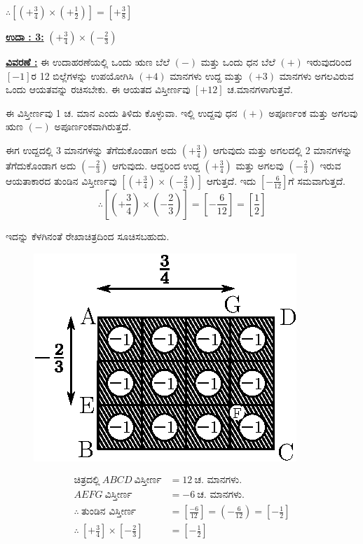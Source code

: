 $\therefore \left[\left(+\frac{3}{4}\right) \times \left(+\frac{1}{2}\right)\right] = \left[+\frac{3}{8}\right]$


\noindent
{\textbf{\underline{ಉದಾ : 3:}}} $\left(+\frac{3}{4} \right) \times \left(-\frac{2}{3} \right)$

\noindent
{\textbf{\underline{ವಿವರಣೆ :}}} ಈ ಉದಾಹರಣೆಯಲ್ಲಿ ಒಂದು ಋಣ ಬೆಲೆ $(-)$ ಮತ್ತು ಒಂದು ಧನ ಬೆಲೆ $(+)$ ಇರುವುದರಿಂದ $[-1]$ರ 12 ಬಿಲ್ಲೆಗಳನ್ನು ಉಪಯೋಗಿಸಿ $(+4)$ ಮಾನಗಳು ಉದ್ದ ಮತ್ತು $(+3)$ ಮಾನಗಳು ಅಗಲವಿರುವ ಒಂದು ಆಯತವನ್ನು ರಚಿಸಬೇಕು. ಈ ಆಯತದ \hbox{ವಿಸ್ತೀರ್ಣವು} $[+12]$ ಚ.ಮಾನಗಳಾಗುತ್ತವೆ.

ಈ ವಿಸ್ತೀರ್ಣವು 1 ಚ. ಮಾನ ಎಂದು ತಿಳಿದು ಕೊಳ್ಳುವಾ. ಇಲ್ಲಿ ಉದ್ದವು ಧನ $(+)$ ಅಪೂರ್ಣಂಕ ಮತ್ತು ಅಗಲವು ಋಣ $(-)$ ಅಪೂರ್ಣಂಕವಾಗಿರುತ್ತದೆ.

ಈಗ ಉದ್ದದಲ್ಲಿ 3 ಮಾನಗಳನ್ನು ತೆಗೆದುಕೊಂಡಾಗ ಅದು $\left(+\frac{3}{4} \right)$ ಆಗುವುದು ಮತ್ತು ಅಗಲದಲ್ಲಿ 2 ಮಾನಗಳನ್ನು ತೆಗೆದುಕೊಂಡಾಗ ಅದು $\left(-\frac{2}{3} \right)$ ಆಗುವುದು. ಆದ್ದರಿಂದ ಉದ್ದ $\left(+\frac{3}{4} \right)$ ಮತ್ತು ಅಗಲವು $\left(-\frac{2}{3} \right)$ ಇರುವ ಆಯತಾಕಾರದ ತುಂಡಿನ ವಿಸ್ತೀರ್ಣವು $\left[\left(+\frac{3}{4} \right) \times \left(-\frac{2}{3} \right)\right]$ ಆಗುತ್ತದೆ. ಇದು $\left[-\frac{6}{12}\right]$ಗೆ ಸಮವಾಗುತ್ತದೆ.
$$
\therefore \left[\left(+\frac{3}{4}\right) \times \left(-\frac{2}{3}\right)\right] = \left[-\frac{6}{12}\right] = \left[\frac{1}{2} \right]
$$

ಇದನ್ನು ಕೆಳಗಿನಂತೆ ರೇಖಾಚಿತ್ರದಿಂದ ಸೂಚಿಸಬಹುದು. 
\begin{figure}[H]
\centering
\includegraphics[scale=0.8]{src/figure/chap3/fig3-25b.eps}
\end{figure}
\begin{align*}
\text{ಚಿತ್ರದಲ್ಲಿ}~ ABCD ~\text{ವಿಸ್ತೀರ್ಣ} & = 12~ \text{ಚ. ಮಾನಗಳು.}\\
AEFG~ \text{ವಿಸ್ತೀರ್ಣ} & = -6~ \text{ಚ. ಮಾನಗಳು.}\\
\therefore~ \text{ತುಂಡಿನ ವಿಸ್ತೀರ್ಣ} &  = \left[\frac{-6}{12}\right] = \left(-\frac{6}{12} \right)=\left[-\frac{1}{2}\right]\\
\therefore~ \left[+ \frac{3}{4}\right] \times \left[-\frac{2}{3}\right] & = \left[- \frac{1}{2}\right]
\end{align*}

